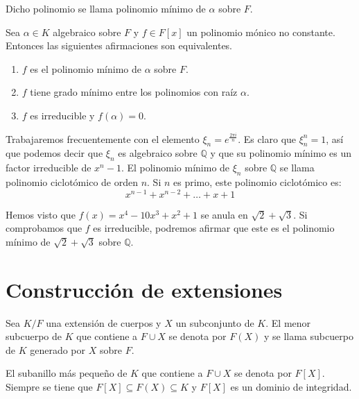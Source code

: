 \begin{definition}
    Dicho polinomio se llama polinomio mínimo de $\alpha$ sobre $F$.
\end{definition}

\begin{proposition}
    Sea $\alpha \in K$ algebraico sobre $F$ y $f \in F[x]$ un polinomio mónico no constante.
    Entonces las siguientes afirmaciones son equivalentes.
    \begin{enumerate}
        \item $f$ es el polinomio mínimo de $\alpha$ sobre $F$.
        \item $f$ tiene grado mínimo entre los polinomios con raíz $\alpha$.
        \item $f$ es irreducible y $f(\alpha) = 0$.
    \end{enumerate}
\end{proposition}

\begin{example}
    Trabajaremos frecuentemente con el elemento $\xi_n = e^{\frac{2\pi i}{n}}$. Es claro que $\xi_n^n = 1$, así que podemos decir que $\xi_n$ es algebraico sobre $\mathbb{Q}$ y que su polinomio mínimo es un factor irreducible de $x^n - 1$.
    El polinomio mínimo de $\xi_n$ sobre $\mathbb{Q}$ se llama polinomio ciclotómico de orden $n$. Si $n$ es primo, este polinomio ciclotómico es:
    $$x^{n-1} + x^{n-2} + \dots + x + 1$$
\end{example}

\begin{example}
    Hemos visto que $f(x) = x^4 - 10x^3 + x^2 + 1$ se anula en $\sqrt{2} + \sqrt{3}$. Si comprobamos que $f$ es irreducible, podremos afirmar que este es el polinomio mínimo de $\sqrt{2} + \sqrt{3}$ sobre $\mathbb{Q}$.
\end{example}

\section{Construcción de extensiones}

\begin{definition}
    Sea $K/F$ una extensión de cuerpos y $X$ un subconjunto de $K$.
    El menor subcuerpo de $K$ que contiene a $F \cup X$ se denota por $F(X)$ y se llama subcuerpo de $K$ generado por $X$ sobre $F$.
\end{definition}

\begin{definition}
    El subanillo más pequeño de $K$ que contiene a $F \cup X$ se denota por $F[X]$.
    Siempre se tiene que $F[X] \subseteq F(X) \subseteq K$ y $F[X]$ es un dominio de integridad.
\end{definition}

